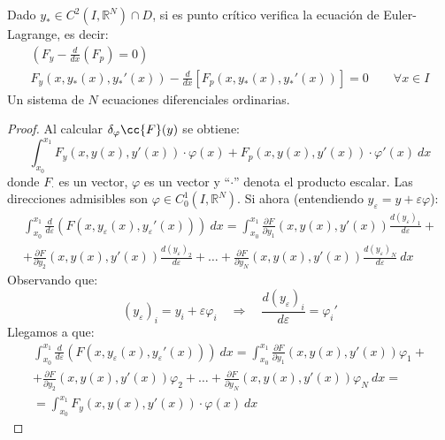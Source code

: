 \begin{prop}
    Dado $y_\ast\in C^2(I,\mathbb{R}^N)\cap D$, si es punto crítico verifica la ecuación de Euler-Lagrange, es decir:
    \begin{gather*}
        \left(F_y - \frac{d}{dx}(F_p) = 0 \right)\\
        F_y(x,y_\ast(x), y_\ast'(x)) - \frac{d}{dx}[F_p(x,y_\ast(x),y_\ast'(x))] = 0 \qquad \forall x\in I
    \end{gather*}
    Un sistema de $N$ ecuaciones diferenciales ordinarias.
    \begin{proof}
        Al calcular $\delta_\varphi \cc{F}(y)$ se obtiene:
        \begin{equation}\label{eq:vectores}
            \int_{x_0}^{x_1} F_y(x,y(x),y'(x))\cdot \varphi(x) + F_p(x,y(x),y'(x))\cdot \varphi'(x)~dx 
        \end{equation}
        donde $F_{\cdot }$ es un vector, $\varphi$ es un vector y ``$\cdot $'' denota el producto escalar. Las direcciones admisibles son $\varphi \in C_0^1(I,\mathbb{R}^N)$. Si ahora (entendiendo $y_\varepsilon = y+\varepsilon\varphi$):
        \begin{multline*}
            \int_{x_0}^{x_1} \frac{d}{d\varepsilon}(F(x,y_\varepsilon(x),y_\varepsilon'(x)))~dx =  \int_{x_0}^{x_1} \frac{\partial F}{\partial y_1}(x,y(x),y'(x))\frac{d(y_\varepsilon)_1}{d\varepsilon} + \\ + \frac{\partial F}{\partial y_2}(x,y(x),y'(x))\frac{d(y_\varepsilon)_2}{d\varepsilon} + \ldots + \frac{\partial F}{\partial y_N}(x,y(x),y'(x))\frac{d(y_\varepsilon)_N}{d\varepsilon}~dx 
        \end{multline*}
        Observando que:
        \begin{equation*}
            (y_\varepsilon)_i = y_i + \varepsilon\varphi_i \quad\Longrightarrow\quad \frac{d(y_\varepsilon)_i}{d\varepsilon} = \varphi_i'
        \end{equation*}
        Llegamos a que:
        \begin{multline*}
            \int_{x_0}^{x_1} \frac{d}{d\varepsilon}(F(x,y_\varepsilon(x),y_\varepsilon'(x)))~dx = \int_{x_0}^{x_1} \frac{\partial F}{\partial y_1}(x,y(x),y'(x))\varphi_1 + \\ + \frac{\partial F}{\partial y_2}(x,y(x),y'(x))\varphi_2 + \ldots + \frac{\partial F}{\partial y_N}(x,y(x),y'(x))\varphi_N~dx  = \\
            = \int_{x_0}^{x_1} F_y(x,y(x),y'(x))\cdot \varphi(x)~dx 

\end{multline*}
\end{proof}
\end{prop}
